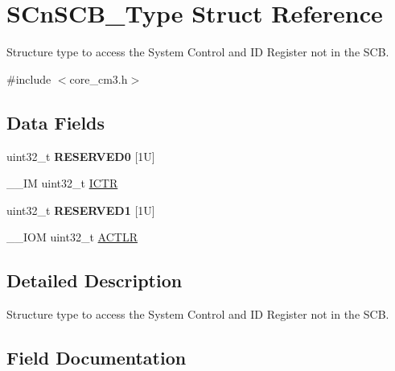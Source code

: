 \hypertarget{struct_s_cn_s_c_b___type}{}\section{S\+Cn\+S\+C\+B\+\_\+\+Type Struct Reference}
\label{struct_s_cn_s_c_b___type}


Structure type to access the System Control and ID Register not in the S\+CB.  




{\ttfamily \#include $<$core\+\_\+cm3.\+h$>$}

\subsection*{Data Fields}
\begin{DoxyCompactItemize}
\item 
\mbox{\label{struct_s_cn_s_c_b___type_affae06cd6df5e9fe9a92994052fd3bec}} 
uint32\+\_\+t {\bfseries R\+E\+S\+E\+R\+V\+E\+D0} \mbox{[}1\+U\mbox{]}
\item 
\+\_\+\+\_\+\+IM uint32\+\_\+t \hyperlink{struct_s_cn_s_c_b___type_acf9b76331abd768af25a10b3625da4b4}{I\+C\+TR}
\item 
\mbox{\label{struct_s_cn_s_c_b___type_aaa45b15c650670f4f84000a1f419ca00}} 
uint32\+\_\+t {\bfseries R\+E\+S\+E\+R\+V\+E\+D1} \mbox{[}1\+U\mbox{]}
\item 
\+\_\+\+\_\+\+I\+OM uint32\+\_\+t \hyperlink{struct_s_cn_s_c_b___type_afabed911b9f91f9df848999e1b5d6504}{A\+C\+T\+LR}
\end{DoxyCompactItemize}


\subsection{Detailed Description}
Structure type to access the System Control and ID Register not in the S\+CB. 

\subsection{Field Documentation}
\mbox{\label{struct_s_cn_s_c_b___type_afabed911b9f91f9df848999e1b5d6504}} 
